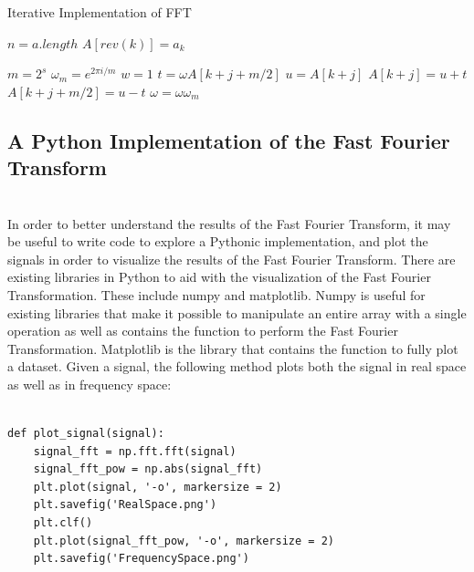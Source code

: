 \documentclass{amsproc}
\begin{document}
\begin{algorithm}
\caption{Iterative Implementation of FFT}\label{it-fft}
\begin{algorithmic}[1]

\State $n = a.length$
	\State $A[rev(k)] = a_k$ 
\EndFor

\EndProcedure


\State {}
	\State $m = 2^s$
	\State $\omega_m = e^{2 \pi i / m}$
		\State $w = 1$
			\State $t = \omega A[k + j + m/2]$
			\State $u = A[k+j]$
			\State $A[k+j] = u + t$
			\State $A[k+j+m/2] = u - t$
			\State $\omega = \omega \omega_m$
		\EndFor
	\EndFor
\EndFor

\EndProcedure

\end{algorithmic}
\end{algorithm}

\subsection{A Python Implementation of the Fast Fourier Transform}

\mbox{}	 \\
\indent In order to better understand the results of the Fast Fourier Transform, it may be useful to write code to explore a Pythonic implementation, and  plot the signals in order to visualize the results of the Fast Fourier Transform. There are existing libraries in Python to aid with the visualization of the Fast Fourier Transformation. These include numpy and matplotlib. Numpy is useful for existing libraries that make it possible to manipulate an entire array with a single operation as well as contains the function to perform the Fast Fourier Transformation. Matplotlib is the library that contains the function to fully plot a dataset. Given a signal, the following method plots both the signal in real space as well as in frequency space:

\begin{Verbatim}[tabsize=4]

def plot_signal(signal):
	signal_fft = np.fft.fft(signal)
	signal_fft_pow = np.abs(signal_fft)
	plt.plot(signal, '-o', markersize = 2)
	plt.savefig('RealSpace.png')
	plt.clf()
	plt.plot(signal_fft_pow, '-o', markersize = 2)
	plt.savefig('FrequencySpace.png')
	
\end{Verbatim}
\end{document}
